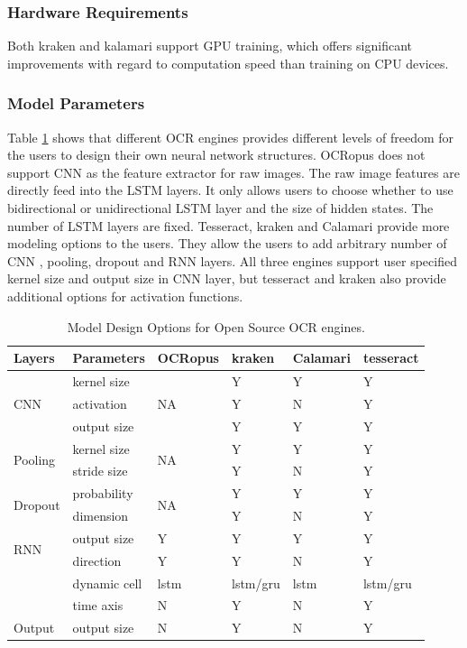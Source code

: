 \documentclass[conference]{IEEEtran}
\begin{document}
\subsubsection*{Hardware Requirements}

Both kraken and kalamari support GPU training, which offers significant
improvements with regard to computation speed than training on CPU devices. 

\subsubsection*{Model Parameters}

Table \ref{tab:model_param1} shows that different OCR engines provides
different levels of freedom for the users to design their own neural network
structures. OCRopus does not support CNN as the feature extractor for raw
images. The raw image features are directly feed into the LSTM layers. It only
allows users to choose whether to use bidirectional or unidirectional LSTM
layer and the size of hidden states. The number of LSTM layers are fixed.
Tesseract, kraken and Calamari provide more modeling options to the users. They
allow the users to add arbitrary number of CNN , pooling, dropout and RNN
layers. All three engines support user specified kernel size and output size in
CNN layer, but tesseract and kraken also provide additional options for
activation functions. 

\begin{table}[bt]
\begin{tabular}{llllll}
\hline
Layers   &Parameters & OCRopus     & kraken                      & Calamari & tesseract\\ \hline
\multirow{ 3}{*}{CNN} & kernel size & \multirow{ 3}{*}{NA} & Y & Y & Y  \\
& activation &  & Y & N & Y \\
& output size & & Y & Y &  Y\\\hline
\multirow{2}{*}{Pooling} &kernel size & \multirow{2}{*}{NA} &  Y & Y & Y \\
& stride size &  & Y & N & Y \\\hline
\multirow{2}{*}{Dropout} &probability & \multirow{2}{*}{NA} &  Y & Y & Y\\
&dimension &  & Y & N & Y \\\hline
\multirow{2}{*}{RNN} & output size & Y &  Y & Y & Y\\
& direction & Y & Y & N & Y \\
& dynamic cell & lstm & lstm/gru & lstm & lstm/gru\\
& time axis& N & Y & N & Y \\\hline
Output & output size& N & Y & N & Y \\
\end{tabular}
\caption{Model Design Options for Open Source OCR engines.}
\label{tab:model_param1}
\end{table}
\end{document}
